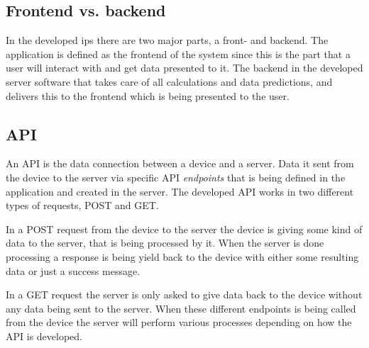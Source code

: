\subsection{Frontend vs. backend}\label{sec:implArchitectureFrontBack}
In the developed \acrshort{ips} there are two major parts, a front- and backend.
The application is defined as the frontend of the system since this is the part that a user will interact with and get data presented to it. 
The backend in the developed server software that takes care of all calculations and data predictions, and delivers this to the frontend which is being presented to the user.


\subsection{API}\label{sec:implArchitectureApi}
An API is the data connection between a device and a server.
Data it sent from the device to the server via specific API \textit{endpoints} that is being defined in the application and created in the server.
The developed API works in two different types of requests, POST and GET.

\bigskip

In a POST request from the device to the server the device is giving some kind of data to the server, that is being processed by it.
When the server is done processing a response is being yield back to the device with either some resulting data or just a success message.

\bigskip

In a GET request the server is only asked to give data back to the device without any data being sent to the server.
When these different endpoints is being called from the device the server will perform various processes depending on how the API is developed.

